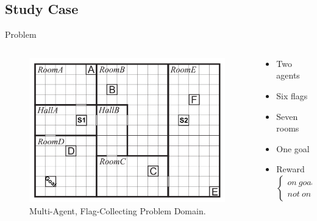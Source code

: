 \documentclass{bredelebeamer}
\begin{document}
\subsection{Study Case}
\begin{frame}{Problem}

\begin{columns}
\begin{column}{0.5\linewidth}
\begin{figure}[h!]
\centering
  \includegraphics[width=\linewidth]{../article/img/stydyCase.png}
  \caption{Multi-Agent, Flag-Collecting Problem Domain.}
  \label{fig:studycase1}
\end{figure}
\end{column}

\begin{column}{0.5\linewidth}
\begin{block}{}
\begin{itemize}
\item Two agents
\item Six flags
\item Seven rooms
\item One goal
\item Reward  $\left\{
\begin{array}{l}
on\ goal =  Flags*100 \\
not\ on\ goal = 0
\end{array}
\right.$
\end{itemize}


\end{block}
\end{column}

\end{columns}

\end{frame}
\end{document}
